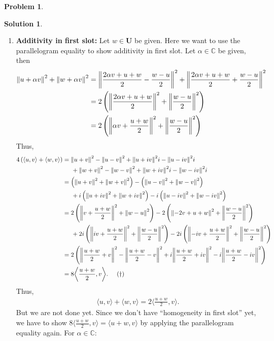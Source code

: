 \documentclass{article}
\theoremstyle{definition}
\newtheorem*{prob*}{Problem}
\newtheorem*{sln*}{Solution}
\newcommand{\U}{\mathbf{U}}
\newcommand{\la}{\langle}
\newcommand{\ra}{\rangle}
\begin{document}
\begin{prob*}
\begin{enumerate}
\begin{sln*}
\begin{enumerate}
				\item \textbf{Additivity in first slot:} Let $w\in \U$ be given. Here we want to use the parallelogram equality to show additivity in first slot. Let $\alpha \in \mathbb{C}$ be given, then
				\begin{align*}
				\norm{u + \alpha v}^2 + \norm{w + \alpha v}^2 &= \norm{\frac{2\alpha v+u+w}{2} - \frac{w-u}{2}}^2 + \norm{\frac{2\alpha v+u+w}{2} + \frac{w-u}{2}}^2 \\
				&= 2 \left( \norm{\frac{2\alpha v+ u + w}{2}}^2 + \norm{\frac{w-u}{2}}^2  \right)\\
				&= 2 \left( \norm{\alpha v  + \frac{u + w}{2}}^2 + \norm{\frac{w-u}{2}}^2  \right)\\
				\end{align*}
				Thus, 
				\begin{align*}
				4\left(\la u,v \ra + \la w,v \ra\right) 
				&= \norm{u+ v}^2  - \norm{u-v}^2 + \norm{u + iv}^2i - \norm{u - iv}^2i \\
				&\hspace{0.5cm}+ \norm{w+ v}^2  - \norm{w-v}^2 + \norm{w + iv}^2i - \norm{w - iv}^2i\\
				&=  \left(\norm{u+ v}^2 + \norm{w+ v}^2\right) - \left(\norm{u-v}^2 + \norm{w-v}^2 \right) \\ 
				&\hspace{0.5cm}+ i \left( \norm{u + iv}^2  + \norm{w + iv}^2 \right) - i\left(\norm{u - iv}^2 + \norm{w - iv}^2 \right) \\
				&= 2\left( \norm{ v + \frac{ u + w}{2}}^2 + \norm{w - u}^2 \right) 
				- 2\left( \norm{ - 2v + u + w}^2 + \norm{\frac{w - u}{2}}^2 \right) \\
				&\hspace{0.5cm} + 2i\left( \norm{ iv + \frac{u + w}{2}}^2 + \norm{\frac{w - u}{2}}^2 \right)
				- 2i\left( \norm{ -iv + \frac{u + w}{2}}^2 + \norm{\frac{w - u}{2}}^2 \right)\\
				&= 2\left( \norm{ \frac{u + w}{2}+ v}^2 - \norm{\frac{u + w}{2} -v}^2 + i\norm{\frac{u+w}{2}+iv}^2 - i\norm{\frac{u+w}{2}-iv}^2 \right)\\
				&= 8 \bigg\langle \frac{u+w}{2}, v \bigg\rangle. \hspace{0.5cm} (\dagger)
				\end{align*}
				Thus, 
				\begin{align*}
				\la u,v \ra + \la w, v \ra = 2\bigg\la \frac{u+w}{2} ,v \bigg\ra.
				\end{align*}
				But we are not done yet. Since we don't have ``homogeneity in first slot'' yet, we have to show $8 \bigg\langle \frac{u+w}{2}, v \bigg\rangle = \la u+ w, v \ra$ by applying the parallelogram equality again. For $\alpha \in \mathbb{C}$:

\end{enumerate}
\end{sln*}
\end{enumerate}
\end{prob*}
\end{document}
